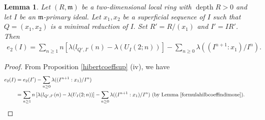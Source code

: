 \documentclass[reqno,a4paper,dvipsnames]{amsart}
\newcommand{\m}{\mathfrak{m} }
\newcommand{\depth}{\operatorname{depth}}
\newtheorem{lemma}[theorem]{Lemma}
\theoremstyle{definition}
\begin{document}
\begin{lemma} \label{2-II}
    Let $(R,\m)$ be a two-dimensional  local ring with $\depth R>0$ and let $I$ be an $\m$-primary ideal. Let $x_{1}, x_{2} $ be a superficial sequence of $I$ such that $Q=(x_{1},x_{2})$ is a minimal reduction of $I.$  Set $R' = R/(x_1)$ and $I' = IR'$. Then
    \begin{align*}
    e_{2}(I)= \displaystyle\sum_{n \geq 1} n\left[\lambda(l_{Q', I'}(n)
- \lambda(U_{I}(2;n))\right]
-  \displaystyle \sum_{n\geq 0}\lambda((I^{n+1}:x_1)/I^{n}).
\end{align*}
\end{lemma}

\begin{proof}
    From Proposition \ref{hibertcoeffsup} (iv),  we have 
 \begin{align*}
 \nonumber
e_{2}(I) 
& =  e_{2}(I')-  \displaystyle \sum_{n\geq 0}\lambda((I^{n+1}:x_1)/I^{n})    \\
&= \displaystyle\sum_{n \geq 1} n\left[\lambda(l_{Q', I'}(n)
- \lambda(U_{I}(2;n))\right]
-  \displaystyle \sum_{n\geq 0}\lambda((I^{n+1}:x_1)/I^{n}) \text{ (by Lemma \ref{formulahilbcoeffindimone})}. && \qedhere
\end{align*} 
\end{proof}
\end{document}
